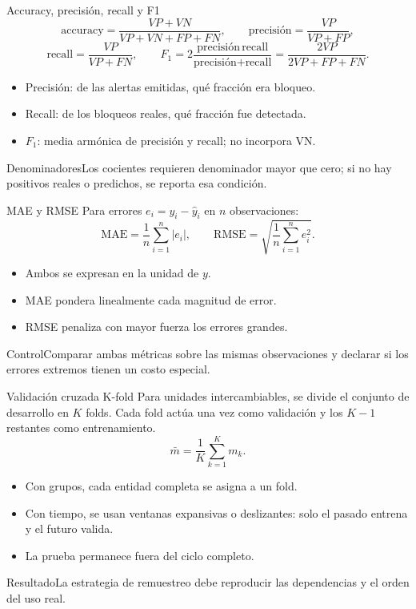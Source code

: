 \documentclass[aspectratio=169,10pt]{beamer}
\begin{document}
\begin{frame}{Accuracy, precisión, recall y F1}
  \small
  \[\text{accuracy}=\frac{VP+VN}{VP+VN+FP+FN},\qquad \text{precisión}=\frac{VP}{VP+FP},\]
  \[\text{recall}=\frac{VP}{VP+FN},\qquad F_1=2\frac{\text{precisión}\,\text{recall}}{\text{precisión}+\text{recall}}=\frac{2VP}{2VP+FP+FN}.\]
  \begin{itemize}
    \item Precisión: de las alertas emitidas, qué fracción era bloqueo.
    \item Recall: de los bloqueos reales, qué fracción fue detectada.
    \item $F_1$: media armónica de precisión y recall; no incorpora VN.
  \end{itemize}
  \begin{alertblock}{Denominadores}Los cocientes requieren denominador mayor que cero; si no hay positivos reales o predichos, se reporta esa condición.\end{alertblock}
\end{frame}

\begin{frame}{MAE y RMSE}
  \small Para errores $e_i=y_i-\hat y_i$ en $n$ observaciones:
  \[\mathrm{MAE}=\frac{1}{n}\sum_{i=1}^{n}|e_i|,\qquad \mathrm{RMSE}=\sqrt{\frac{1}{n}\sum_{i=1}^{n}e_i^2}.\]
  \begin{itemize}
    \item Ambos se expresan en la unidad de $y$.
    \item MAE pondera linealmente cada magnitud de error.
    \item RMSE penaliza con mayor fuerza los errores grandes.
  \end{itemize}
  \begin{alertblock}{Control}Comparar ambas métricas sobre las mismas observaciones y declarar si los errores extremos tienen un costo especial.\end{alertblock}
\end{frame}

\begin{frame}{Validación cruzada K-fold}
  \small Para unidades intercambiables, se divide el conjunto de desarrollo en $K$ folds. Cada fold actúa una vez como validación y los $K-1$ restantes como entrenamiento.
  \[\bar m=\frac{1}{K}\sum_{k=1}^{K}m_k.\]
  \begin{itemize}
    \item Con grupos, cada entidad completa se asigna a un fold.
    \item Con tiempo, se usan ventanas expansivas o deslizantes: solo el pasado entrena y el futuro valida.
    \item La prueba permanece fuera del ciclo completo.
  \end{itemize}
  \begin{block}{Resultado}La estrategia de remuestreo debe reproducir las dependencias y el orden del uso real.\end{block}
\end{frame}
\end{document}
